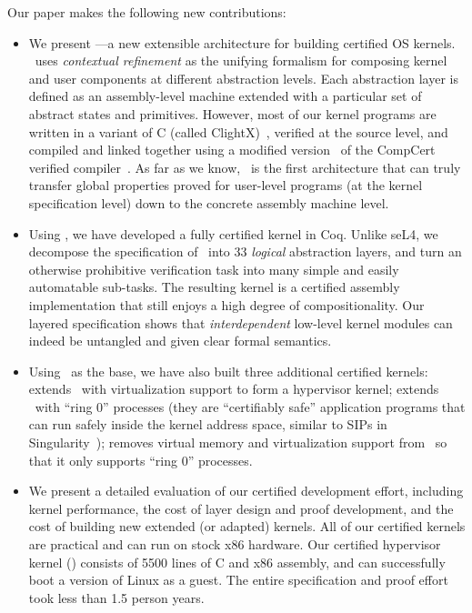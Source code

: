 Our paper makes the following new contributions:
\begin{itemize} \itemsep 0pt
\item We present {\bf{}\CTOS}---a new extensible architecture for
  building certified OS kernels. \CTOS\ uses {\em contextual
    refinement} as the unifying formalism for composing kernel and
  user components at different abstraction levels.  Each abstraction
  layer is defined as an assembly-level machine extended with a
  particular set of abstract states and primitives.  However, most of
  our kernel programs are written in a variant of C (called
  ClightX)~\cite{dscal15}, verified at the source level, and compiled
  and linked together using a modified version~\cite{dscal15} of the
  CompCert verified compiler~\cite{compcert,leroy09}.  As far as we
  know, \CTOS\ is the first architecture that can truly transfer
  global properties proved for user-level programs (at the kernel
  specification level) down to the concrete assembly machine level.
\item Using \CTOS, we have developed a fully certified
  {\bf \mCTOS} kernel in Coq. Unlike seL4, 
  we decompose the specification of \mCTOS\ 
  into 33 {\em logical} abstraction layers, and turn an otherwise 
  prohibitive verification task into many simple and easily automatable 
  sub-tasks. The resulting kernel is a certified assembly implementation 
  that still enjoys a high degree of compositionality.
  Our layered specification shows that
  {\em interdependent} low-level kernel modules can indeed be
  untangled and given clear formal semantics.
\item Using \mCTOS\ as the base, we have also built three additional
  certified kernels: {\bf{}\mCTOShyper} extends \mCTOS\ with virtualization
  support to form a hypervisor kernel;
  {\bf{}\mCTOSringz} extends \mCTOShyper\ with ``ring 0'' processes
  (they are ``certifiably safe'' application programs that can run safely 
  inside the kernel address space, similar to SIPs in 
  Singularity~\cite{hunt07}); {\bf{}\mCTOSembed} removes virtual memory
  and virtualization support from \mCTOSringz\ so that it only supports 
  ``ring 0'' processes.
\item We present a detailed evaluation of our certified development
  effort, including kernel performance, the cost of
  layer design and proof development,
  and the cost of building new extended (or adapted)
  kernels. All of our certified kernels are practical and can run on stock
  x86 hardware. Our certified hypervisor kernel (\mCTOShyper) consists
  of 5500 lines of C and x86 assembly, and can successfully boot 
  a version of Linux as a guest. The entire specification and proof effort 
  took less than 1.5 person years. 
\end{itemize}

